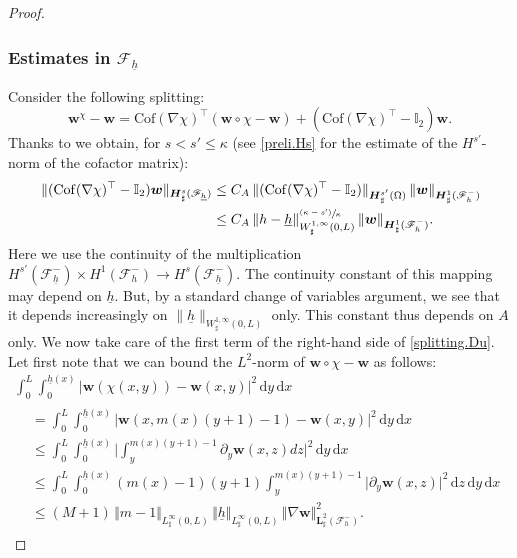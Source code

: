 \documentclass[10pt]{amsart}
\let\mathcal\mathscr
\newcommand{\psfrac}[2]{\sfrac{(#1)}{#2}}
\theoremstyle{remark}
\theoremstyle{definition}
\newcommand{\norme}[1]{\,\Vert #1\Vert}
\newcommand{\dd}{\,\mathrm{d}}
\newcommand{\wg}{\boldsymbol{w}}
\newcommand{\BS}[1]{\boldsymbol{#1}}
\let\CM\Omega
\newcommand{\hb}{{\underline{h}}}
\newcommand{\Cof}{\mathrm{Cof}}
\begin{document}
\begin{proof}
\subsubsection*{Estimates in $\mathcal{F}_{\hb}$}
Consider the following splitting:
\begin{equation}\label{splitting.Du}
\wg^\chi - \wg = \Cof(\nabla\chi)^{\top}(\wg\circ\chi - \wg) +(\Cof(\nabla\chi)^{\top}-\mathbb I_2)\wg.
\end{equation}
Thanks to \cite[Prop.\,B.1]{Grubsolo} we obtain, for $s<s'\leq \kappa$ (see \eqref{preli.Hs} for the estimate of the $H^{s'}$-norm of the cofactor matrix):
\[
\begin{aligned}
\norme{(\Cof(\nabla\chi)^{\top}-\mathbb I_2)\wg}_{ \BS{H}^{s}_{\sharp}(\mathcal{F}_{\hb})}&\leq C_{A} \norme{(\Cof(\nabla\chi)^{\top}-\mathbb I_2)}_{ \BS{H}^{s'}_{\sharp}(\CM)}\norme{\wg}_{\BS{H}^{1}_{\sharp}(\mathcal{F}^{-}_{h})}\\
&\leq C_A \norme{h-\hb}_{W^{1,\infty}_{\sharp}(0,L)}^{\psfrac{\kappa-s'}{\kappa}}\norme{\wg}_{\BS{H}^{1}_{\sharp}(\mathcal{F}^{-}_{h})}.
\end{aligned}
\]
Here we use the continuity of the
multiplication
$H^{s'}(\mathcal F^{-}_{\hb}) \times H^{1}(\mathcal F^{-}_{h}) \to
H^{s}(\mathcal F^{-}_{\hb})$. The continuity constant of this mapping
may depend on $\hb$. But, by a standard change of variables argument, we see that it depends increasingly on $\|\hb\|_{W^{1,\infty}_{\sharp}(0,L)}$ only. This constant thus depends on $A$ only.
We now take care of the first term of the right-hand side of \eqref{splitting.Du}.
Let first note that we can bound the $L^2$-norm of $\wg \circ \chi - \wg$ as follows:
\begin{multline*}
\int_{0}^{L}\int_{0}^{\hb(x)}\vert\wg(\chi(x,y)) - \wg(x,y)\vert^{2}\dd y\dd x
\\
\begin{aligned}
& =\int_{0}^{L}\int_{0}^{\hb(x)}\vert \wg(x,m(x)(y+1)-1)-\wg(x,y)\vert^{2}\dd y\dd x\\
&\leq \int_{0}^{L}\int_{0}^{\hb(x)}\biggl\vert \int_{y}^{m(x)(y+1)-1}\partial_y\wg(x,z)dz\biggr\vert^{2}\dd y\dd x\\
&\leq \int_{0}^{L}\int_{0}^{\hb(x)}(m(x)-1)(y+1)\int_{y}^{m(x)(y+1)-1}\vert \partial_y\wg(x,z)\vert^{2}\dd z\dd y\dd x\\
&\leq (M+1)\norme{m-1}_{L^{\infty}_{\sharp}(0,L)}\norme{\hb}_{L^{\infty}_{\sharp}(0,L)}\norme{\nabla\wg}_{\BS{L}^{2}_{\sharp}(\mathcal{F}^{-}_{h})}^{2}.
\end{aligned}
\end{multline*}

\end{proof}
\end{document}
